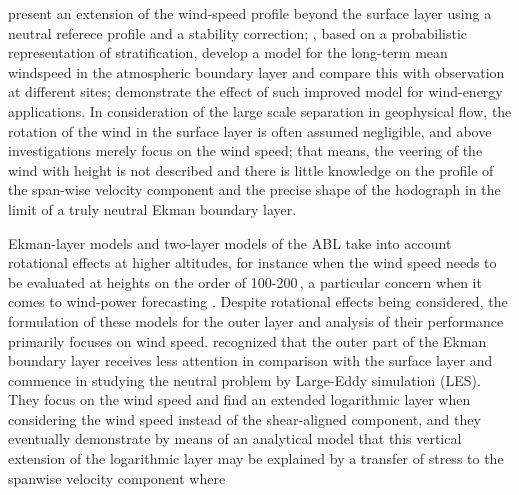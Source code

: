 \documentclass[a4paper,11pt]{amsart}
\begin{document}
\cite{gryning:BM2007} present an extension of the wind-speed profile beyond the surface layer
using a neutral referece profile and a stability correction;
\cite{kelly:BM2010}, based on a probabilistic representation of stratification,
develop a model for the long-term mean windspeed
in the atmospheric boundary layer and compare this with observation at different sites; 
\cite{kelly:WE2016} demonstrate the effect of such improved model for wind-energy applications.
%
In consideration of the large scale separation in geophysical flow, the rotation of the wind in the
surface layer is often assumed negligible, and above investigations merely focus on the wind speed; 
that means, the veering of the wind with height is not described and there is little knowledge on the
profile of the span-wise velocity component and the precise shape of the hodograph in the limit of a
truly neutral Ekman boundary layer.
%
%
\par %
%
Ekman-layer models and two-layer models of the ABL take into account rotational effects at higher altitudes,
for instance when the wind speed needs to be evaluated at heights on the order of 100-200\,,
a particular concern when it comes to wind-power forecasting \citep{optis:BM2014}.
%
Despite rotational effects being considered, the formulation of these models for the outer layer
and analysis of their performance primarily focuses on wind speed.
% 
\cite{jiang:JAS2018} recognized that the outer part of the Ekman boundary layer receives less attention in comparison
with the surface layer and commence in studying the neutral problem by Large-Eddy simulation (LES).
%
They focus on the wind speed and find an extended logarithmic layer when considering the wind speed instead of
the shear-aligned component, and they eventually demonstrate by means of an analytical model that this vertical
extension of the logarithmic layer may be explained by a transfer of stress to the spanwise velocity component where
\end{document}
